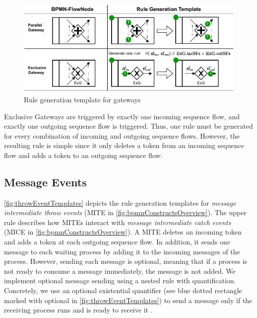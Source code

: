 \documentclass[runningheads]{llncs}
\begin{document}
\begin{figure}[ht]
    \centering
    \includegraphics[width=1\textwidth]{images/gateways_template.pdf}
    \caption{Rule generation template for gateways}
    \label{fig:gatewayTemplates}
\end{figure}

Exclusive Gateways are triggered by exactly one incoming sequence flow, and exactly one outgoing sequence flow is triggered.
Thus, one rule must be generated for every combination of incoming and outgoing sequence flows.
However, the resulting rule is simple since it only deletes a token from an incoming sequence flow and adds a token to an outgoing sequence flow.

\subsection{Message Events}
\autoref{fig:throwEventTemplates} depicts the rule generation templates for \textit{message intermediate throw events} (\textsf{MITE} in \autoref{fig:bpmnConstructsOverview}).
The upper rule describes how MITEs interact with \textit{message intermediate catch events} (\textsf{MICE} in \autoref{fig:bpmnConstructsOverview}).
A MITE deletes an incoming token and adds a token at each outgoing sequence flow.
In addition, it sends one message to each waiting process by adding it to the incoming messages of the process.
However, sending each message is optional, meaning that if a process is not ready to consume a message immediately, the message is not added.
We implement optional message sending using a nested rule with quantification.
Concretely, we use an optional existential quantifier (see blue dotted rectangle marked with optional in \autoref{fig:throwEventTemplates}) to send a message only if the receiving process runs and is ready to receive it \cite{rensinkNestedQuantificationGraph2006}.
\end{document}
